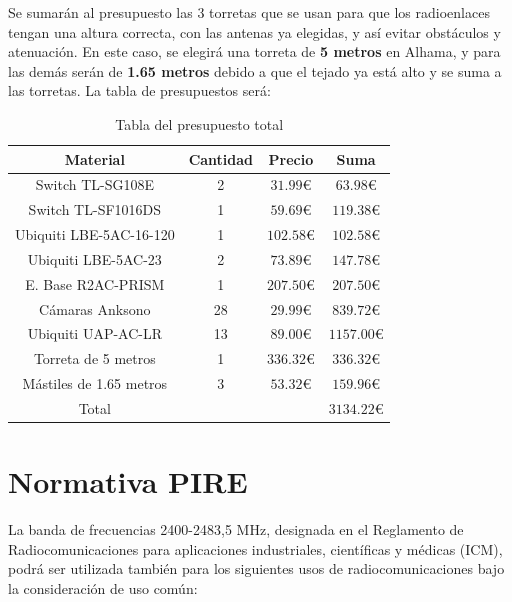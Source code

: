 \documentclass{article}
\begin{document}
Se sumarán al presupuesto las 3 torretas que se usan para que los radioenlaces tengan una altura correcta, con las antenas ya elegidas, y así evitar obstáculos y atenuación. En este caso, se elegirá una torreta de \textbf{5 metros} en Alhama, y para las demás serán de \textbf{1.65 metros} debido a que el tejado ya está alto y se suma a las torretas. La tabla de presupuestos será:

\begin{table}[ht]
    \centering
    \begin{tabular}{|c|c|c|c|}
        \hline
        Material & Cantidad & Precio & Suma \\
        \hline
        Switch TL-SG108E & 2 & $31.99\euro{}$ & $63.98\euro{}$ \\
        Switch TL-SF1016DS & 1 & $59.69\euro{}$ & $119.38\euro{}$ \\
        Ubiquiti LBE-5AC-16-120  & 1 & $102.58\euro{}$ & $102.58\euro{}$ \\
        Ubiquiti LBE-5AC-23& 2 & $73.89\euro{}$ & $147.78\euro{}$ \\
        E. Base R2AC-PRISM & 1 & $207.50\euro{}$ & $207.50\euro{}$ \\
        
        Cámaras Anksono& 28 & $29.99\euro{}$ & $839.72\euro{}$ \\
        Ubiquiti UAP-AC-LR & 13 & $89.00\euro{}$ & $1157.00\euro{}$ \\
        
        Torreta de 5 metros& 1 & $336.32\euro{}$ & $336.32\euro{}$ \\
        Mástiles de 1.65 metros & 3 & $53.32\euro{}$ & $159.96\euro{}$ \\
        \hline
        Total &  &  & $3134.22\euro{}$ \\
        \hline
    \end{tabular}
    \caption{Tabla del presupuesto total }
    \label{tab:presupuestos}
\end{table}



\section{Normativa PIRE}

La banda de frecuencias 2400-2483,5 MHz, designada en el Reglamento de
Radiocomunicaciones para aplicaciones industriales, científicas y médicas (ICM),
podrá ser utilizada también para los siguientes usos de radiocomunicaciones bajo la
consideración de uso común:
\end{document}
